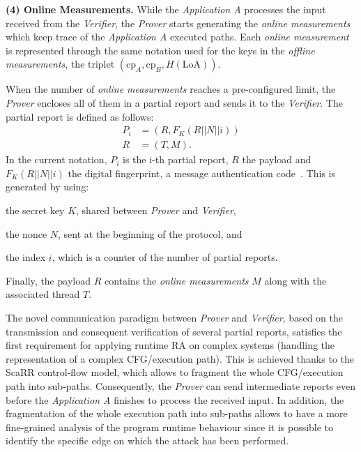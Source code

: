 \textbf{(4) Online Measurements.}
While the \emph{Application A} processes the input received from the 
\emph{Verifier}, the \emph{Prover} starts generating the \emph{online 
measurements} which keep trace of the \emph{Application A} executed paths. Each 
\emph{online measurement} is represented through the same notation used for the 
keys in the \emph{offline measurements}, \ie the triplet  
$(\text{cp}_A,\text{cp}_B,H(\text{LoA}))$.

When the number of \emph{online measurements} reaches a pre-configured limit, 
the \emph{Prover} encloses all of them in a partial report and sends it to the 
\emph{Verifier}. The partial report is defined as follows: 
\begin{equation*}
\begin{split}
P_i &= (R,F_K(R||N||i))\\
R &= (T, M).
\end{split}
\end{equation*}
In the current notation, $P_i$ is the i-th partial report, $R$ the payload and 
$F_K(R||N||i)$ the digital fingerprint, \eg a message authentication 
code~\citep{bellare2000security}.
This is generated by using:
\begin{enumerate*}[label=(\roman*)]
	\item the secret key $K$, shared between \emph{Prover} and \emph{Verifier},
	\item the nonce $N$, sent at the beginning of the protocol, and
	\item the index $i$, which is a counter of the number of partial reports.
\end{enumerate*}
Finally, the payload $R$ contains the \emph{online measurements} $M$ along with 
the associated thread $T$.

The novel communication paradigm between \emph{Prover} and \emph{Verifier}, 
based on the transmission and consequent verification of several partial 
reports, satisfies the first requirement for applying runtime RA on complex 
systems (\ie handling the representation of a complex CFG/execution path). This 
is achieved thanks to the ScaRR control-flow model, which allows to fragment 
the whole CFG/execution path into sub-paths. Consequently, the \emph{Prover} 
can send intermediate reports even before the \emph{Application A} finishes to 
process the received input. In addition, the fragmentation of the whole 
execution path into sub-paths allows to have a more fine-grained analysis of 
the program runtime behaviour since it is possible to identify the specific 
edge on which the attack has been performed. 

